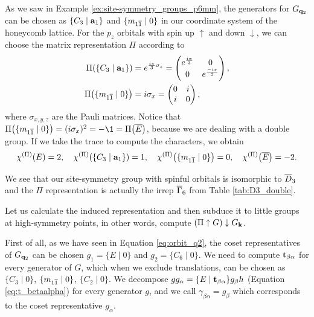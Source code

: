 As we saw in Example \ref{ex:site-symmetry_groups_p6mm}, the generators for $G_{{\vb{q}}_2}$ can be chosen as $\{C_3 \mid {\vb{a}}_1\}$ and $\{m_{1\overline{1}} \mid 0\}$ in our coordinate system of the honeycomb lattice. For the $p_z$ orbitals with spin up $\uparrow$ and down $\downarrow$, we can choose the matrix representation $\Pi$ according to \cite{building_blocks2018, lectures_tms2017}
\begin{align} \label{eq:site_symmetry_Gq2_SU2_matrixrep}
\Pi\qty(\{C_3 \mid {\vb{a}}_1\}) &= e^{\frac{i \pi}{3} \sigma_z} =
\begin{pmatrix}
e^{\frac{i\pi}{3}} & 0 \\
0 & e^{\frac{-i\pi}{3}}
\end{pmatrix},
\\
\Pi\qty(\{m_{1\overline{1}} \mid 0\}) &= i \sigma_x =
\begin{pmatrix}
0 & i \\
i & 0
\end{pmatrix},
\end{align}
where $\sigma_{x,y,z}$ are the Pauli matrices. Notice that $\Pi\qty(\{m_{1\cc{1}} \mid 0\}) = (i \sigma_x)^2 = -\1 = \Pi\qty(\cc{E})$, because we are dealing with a double group. If we take the trace to compute the characters, we obtain
\begin{equation} \label{eq:characters_doublerep_spinfulgraphene}
\chi^{(\Pi)}\qty(E) = 2, \quad
\chi^{(\Pi)}\qty(\{C_3 \mid {\vb{a}}_1\}) = 1, \quad
\chi^{(\Pi)}\qty(\{m_{1\overline{1}} \mid 0\}) = 0, \quad
\chi^{(\Pi)}\qty(\overline{E}) = -2.
\end{equation}

We see that our site-symmetry group with spinful orbitals is isomorphic to $\overline{D}_3$ and the $\Pi$ representation is actually the irrep $\overline{\Gamma}_6$ from Table \ref{tab:D3_double}.

Let us calculate the induced representation and then subduce it to little groups at high-symmetry points, in other words, compute $(\Pi \uparrow G) \downarrow G_{\vb{k}}$.

First of all, as we have seen in Equation \ref{eq:orbit_q2}, the coset representatives of $G_{{\vb{q}}_2}$ can be chosen $g_1 = \{E \mid 0\}$ and $g_2 = \{C_6 \mid 0\}$. We need to compute ${\vb{t}}_{\beta\alpha}$ for every generator of $G$, which when we exclude translations, can be chosen as $\{C_3\mid 0\}$, $\{m_{1\overline{1}} \mid 0\}$, $\{C_2\mid 0\}$. We decompose $g g_\alpha = \{ E \mid {\vb{t}}_{\beta\alpha} \} g_\beta h$ (Equation \ref{eq:t_betaalpha}) for every generator $g$, and we call $\gamma_{\beta\alpha} = g_\beta$ which corresponds to the coset representative $g_\alpha$.

